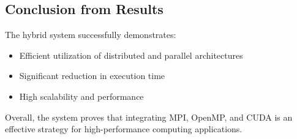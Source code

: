 \documentclass[12pt,a4paper]{article}
\begin{document}
\subsection{Conclusion from Results}

The hybrid system successfully demonstrates:
\begin{itemize}
\item Efficient utilization of distributed and parallel architectures
\item Significant reduction in execution time
\item High scalability and performance
\end{itemize}

Overall, the system proves that integrating MPI, OpenMP, and CUDA is an effective strategy for high-performance computing applications.
\end{document}
